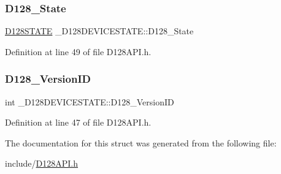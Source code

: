\subsubsection{\texorpdfstring{D128\+\_\+\+State}{D128\_State}}
{\footnotesize\ttfamily \hyperlink{_d128_a_p_i_8h_a37bd6b2ec1438a8cd6a28e7e6ff61885}{D128\+S\+T\+A\+TE} \+\_\+\+D128\+D\+E\+V\+I\+C\+E\+S\+T\+A\+T\+E\+::\+D128\+\_\+\+State}



Definition at line 49 of file D128\+A\+P\+I.\+h.

\mbox{\label{struct___d128_d_e_v_i_c_e_s_t_a_t_e_aa2ea21f882710c40dcac5e10a3c9da0a}} 
\subsubsection{\texorpdfstring{D128\+\_\+\+Version\+ID}{D128\_VersionID}}
{\footnotesize\ttfamily int \+\_\+\+D128\+D\+E\+V\+I\+C\+E\+S\+T\+A\+T\+E\+::\+D128\+\_\+\+Version\+ID}



Definition at line 47 of file D128\+A\+P\+I.\+h.



The documentation for this struct was generated from the following file\+:\begin{DoxyCompactItemize}
\item 
include/\hyperlink{_d128_a_p_i_8h}{D128\+A\+P\+I.\+h}\end{DoxyCompactItemize}
